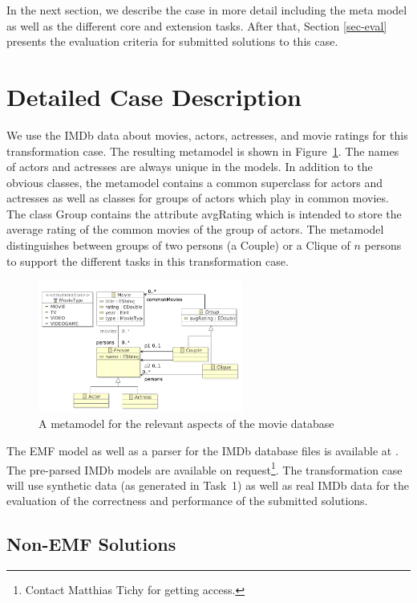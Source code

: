 \documentclass[a4paper,11pt]{article}
\newcommand{\p}[1]{\textsf{\small #1}}
\begin{document}
In the next section, we describe the case in more detail
including the meta model as well as the different core and extension
tasks. After that, Section \ref{sec-eval} presents the evaluation
criteria for submitted solutions to this case.


\section{Detailed Case Description}\label{sec-case}

We use the IMDb data about movies, actors, actresses, and movie ratings for
this transformation case. The resulting metamodel is shown in
Figure~\ref{fig:metamodel}.  The names of actors and actresses are always
unique in the models.  In addition to the obvious classes, the metamodel
contains a common superclass for actors and actresses as well as classes for
groups of actors which play in common movies. The class \p{Group} contains the
attribute \p{avgRating} which is intended to store the average rating of the
common movies of the group of actors. The metamodel distinguishes between
groups of two persons (a \p{Couple}) or a \p{Clique} of $n$ persons to support
the different tasks in this transformation case.

\begin{figure}[ht]
\centering
\includegraphics[width=0.6\textwidth]{movies}
\caption{A metamodel for the relevant aspects of the movie database}
\label{fig:metamodel}
\end{figure}

The EMF model as well as a parser for the IMDb database files is available at
\cite{IMDB2EMF}. The pre-parsed IMDb models are available on
request\footnote{\label{imdb-access}Contact Matthias Tichy for getting
  access.}. The transformation case will use synthetic data (as generated in
Task~1) as well as real IMDb data for the evaluation of the correctness and
performance of the submitted solutions.

\subsection*{Non-EMF Solutions}
\label{sec:non-emf-solutions}
\end{document}
